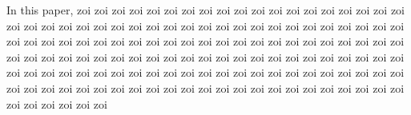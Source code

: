 In this paper, zoi zoi zoi zoi zoi zoi zoi zoi zoi zoi zoi zoi zoi zoi zoi zoi zoi zoi zoi zoi zoi zoi zoi zoi zoi zoi zoi zoi zoi zoi zoi zoi zoi zoi zoi zoi zoi zoi zoi zoi zoi zoi zoi zoi zoi zoi zoi zoi zoi zoi zoi zoi zoi zoi zoi zoi zoi zoi zoi zoi zoi zoi zoi zoi zoi zoi zoi zoi zoi zoi zoi zoi zoi zoi zoi zoi zoi zoi zoi zoi zoi zoi zoi zoi zoi zoi zoi zoi zoi zoi zoi zoi zoi zoi zoi zoi zoi zoi zoi zoi zoi zoi zoi zoi zoi zoi zoi zoi zoi zoi zoi zoi zoi zoi zoi zoi zoi zoi zoi zoi zoi zoi zoi zoi zoi zoi zoi zoi zoi zoi zoi zoi zoi zoi zoi zoi zoi zoi zoi zoi 
